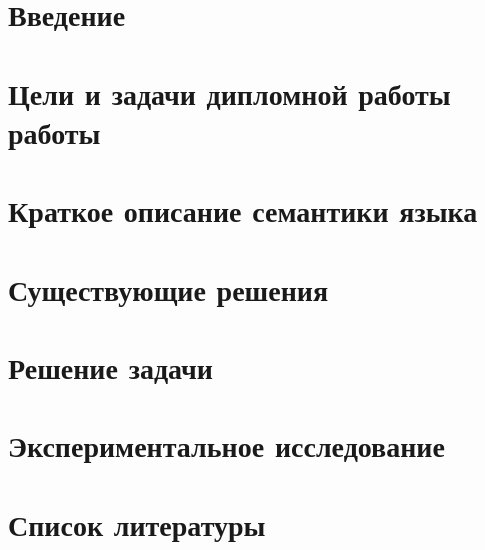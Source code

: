 \documentclass[a4paper, 11pt]{article}
\begin{document}
  \begin{titlepage}
    
  \end{titlepage} 
\tableofcontents
\clearpage
\section{Введение}

\clearpage
 
\section{Цели и задачи дипломной работы работы}

\clearpage
 
\section{Краткое описание семантики языка}

\clearpage
\section{Существующие решения}

\clearpage
 
\section{Решение задачи}

\clearpage
\section{Экспериментальное исследование}

\clearpage 
\renewcommand*{\refname}{}
\section{Список литературы}
 
\end{document}
